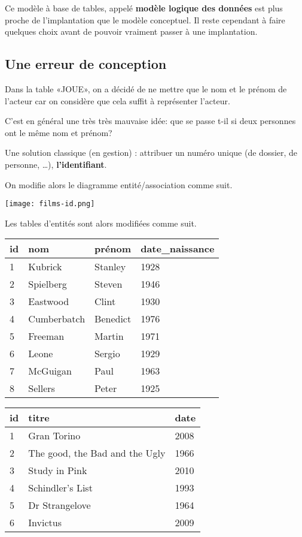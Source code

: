 Ce modèle à  base de tables, appelé \textbf{modèle  logique des données}
est plus proche  de l'implantation que le modèle  conceptuel. Il reste
cependant à  faire quelques choix  avant de pouvoir vraiment  passer à
une implantation.

\subsection{Une erreur de conception}

Dans la table «JOUE», on a décidé de ne mettre que le nom et le prénom
de l'acteur car on considère que cela suffit à représenter l'acteur.

C'est en général une très très mauvaise idée: que se passe t-il si
deux personnes ont le même nom et prénom?

Une solution classique (en gestion) : attribuer un numéro unique (de
dossier, de personne, \ldots{}), \textbf{l'identifiant}.

On modifie alors le diagramme entité/association comme suit. 
\begin{center}
\texttt{[image: films-id.png]}
\end{center}

Les tables d'entités sont alors modifiées comme suit.
\begin{center}
\begin{tabular}{llll}
\toprule
id & nom & prénom & date\_naissance\\
\midrule
1&Kubrick&Stanley&1928\\
2&Spielberg & Steven& 1946\\
3&Eastwood & Clint& 1930\\
4&Cumberbatch & Benedict & 1976\\
5&Freeman & Martin& 1971\\
6&Leone & Sergio & 1929 \\
7&McGuigan & Paul & 1963\\
8& Sellers&Peter&1925\\
\bottomrule
\end{tabular}
\end{center}

\begin{center}
\begin{tabular}{lll}
\toprule
id & titre & date\\
\midrule
1 & Gran Torino & 2008\\
2 & The good, the Bad and the Ugly& 1966\\
3 & Study in Pink & 2010\\
4 & Schindler's List& 1993\\
5 & Dr Strangelove&1964\\
6 & Invictus & 2009\\
\bottomrule
\end{tabular}
\end{center}

